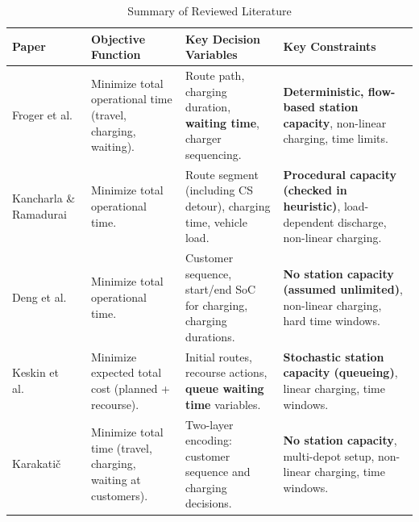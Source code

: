 \FloatBarrier
\begin{table}[!b]
\caption{Summary of Reviewed Literature}
\label{tab:lit_summary}
\centering
\begin{tabular}{|>{\raggedright\arraybackslash}p{}|>{\raggedright\arraybackslash}p{}|>{\raggedright\arraybackslash}p{}|>{\raggedright\arraybackslash}p{}|}
\hline
\textbf{Paper} & \textbf{Objective Function} & \textbf{Key Decision Variables} & \textbf{Key Constraints} \\ \hline
Froger et al.~\cite{Froger2022} & Minimize total operational time (travel, charging, waiting). & Route path, charging duration, \textbf{waiting time}, charger sequencing. & \textbf{Deterministic, flow-based station capacity}, non-linear charging, time limits. \\ \hline
Kancharla \& Ramadurai~\cite{Kancharla2020} & Minimize total operational time. & Route segment (including CS detour), charging time, vehicle load. & \textbf{Procedural capacity (checked in heuristic)}, load-dependent discharge, non-linear charging. \\ \hline
Deng et al.~\cite{Deng2024} & Minimize total operational time. & Customer sequence, start/end SoC for charging, charging durations. & \textbf{No station capacity (assumed unlimited)}, non-linear charging, hard time windows. \\ \hline
Keskin et al.~\cite{Keskin2021} & Minimize expected total cost (planned + recourse). & Initial routes, recourse actions, \textbf{queue waiting time} variables. & \textbf{Stochastic station capacity (queueing)}, linear charging, time windows. \\ \hline
Karakatič~\cite{Karakatic2021} & Minimize total time (travel, charging, waiting at customers). & Two-layer encoding: customer sequence and charging decisions. & \textbf{No station capacity}, multi-depot setup, non-linear charging, time windows. \\ \hline
\end{tabular}%
\end{table}
